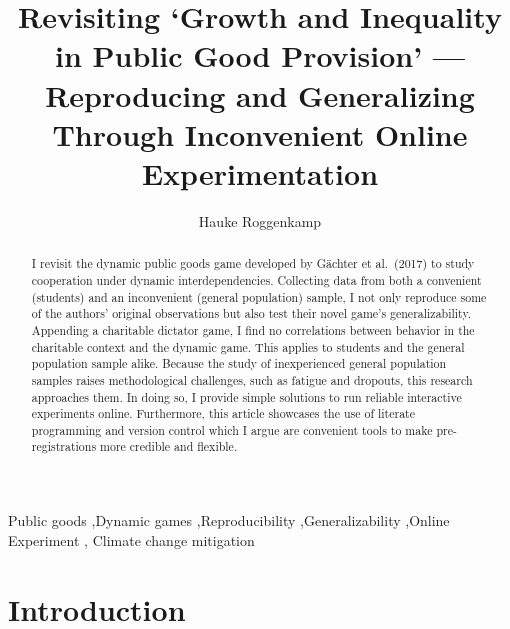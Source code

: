 \documentclass[
  authoryear,
  review,
  3p,
  onecolumn]{elsarticle}
\begin{document}
\begin{frontmatter}
\title{Revisiting `Growth and Inequality in Public Good Provision'
---Reproducing and Generalizing Through Inconvenient Online
Experimentation}
\author[1,2]{Hauke Roggenkamp%
%
}



        
\begin{abstract}
I revisit the dynamic public goods game developed by Gächter et
al.~(2017) to study cooperation under dynamic interdependencies.
Collecting data from both a convenient (students) and an inconvenient
(general population) sample, I not only reproduce some of the authors'
original observations but also test their novel game's generalizability.
Appending a charitable dictator game, I find no correlations between
behavior in the charitable context and the dynamic game. This applies to
students and the general population sample alike. Because the study of
inexperienced general population samples raises methodological
challenges, such as fatigue and dropouts, this research approaches them.
In doing so, I provide simple solutions to run reliable interactive
experiments online. Furthermore, this article showcases the use of
literate programming and version control which I argue are convenient
tools to make pre-registrations more credible and flexible.
\end{abstract}





\begin{keyword}
    Public goods \sep Dynamic
games \sep Reproducibility \sep Generalizability \sep Online
Experiment \sep 
    Climate change mitigation
\end{keyword}
\end{frontmatter}\ifdefined\Shaded\renewenvironment{Shaded}{\begin{tcolorbox}[sharp corners, frame hidden, borderline west={3pt}{0pt}{shadecolor}, breakable, enhanced, interior hidden, boxrule=0pt]}{\end{tcolorbox}}\fi

\hypertarget{sec-intro}{%
\section{Introduction}\label{sec-intro}}
\end{document}
